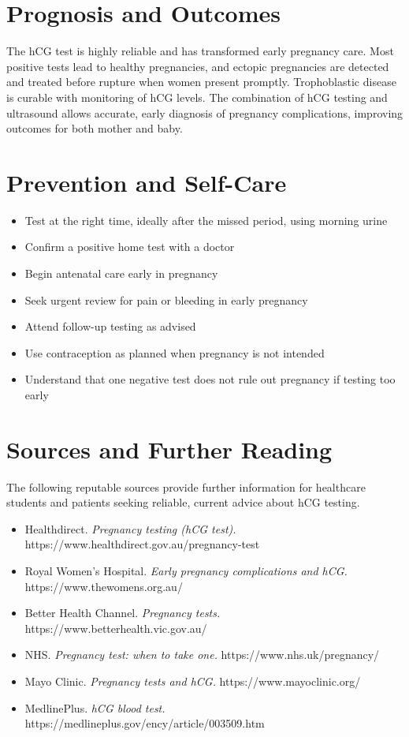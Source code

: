 \section*{Prognosis and Outcomes}
The hCG test is highly reliable and has transformed early pregnancy care. Most positive tests lead to healthy pregnancies, and ectopic pregnancies are detected and treated before rupture when women present promptly. Trophoblastic disease is curable with monitoring of hCG levels. The combination of hCG testing and ultrasound allows accurate, early diagnosis of pregnancy complications, improving outcomes for both mother and baby.

\section*{Prevention and Self-Care}
\begin{itemize}
    \item Test at the right time, ideally after the missed period, using morning urine
    \item Confirm a positive home test with a doctor
    \item Begin antenatal care early in pregnancy
    \item Seek urgent review for pain or bleeding in early pregnancy
    \item Attend follow-up testing as advised
    \item Use contraception as planned when pregnancy is not intended
    \item Understand that one negative test does not rule out pregnancy if testing too early
\end{itemize}

\section*{Sources and Further Reading}
The following reputable sources provide further information for healthcare students and patients seeking reliable, current advice about hCG testing.

\begin{itemize}
    \item Healthdirect. \textit{Pregnancy testing (hCG test).} https://www.healthdirect.gov.au/pregnancy-test
    \item Royal Women's Hospital. \textit{Early pregnancy complications and hCG.} https://www.thewomens.org.au/
    \item Better Health Channel. \textit{Pregnancy tests.} https://www.betterhealth.vic.gov.au/
    \item NHS. \textit{Pregnancy test: when to take one.} https://www.nhs.uk/pregnancy/
    \item Mayo Clinic. \textit{Pregnancy tests and hCG.} https://www.mayoclinic.org/
    \item MedlinePlus. \textit{hCG blood test.} https://medlineplus.gov/ency/article/003509.htm
\end{itemize}
